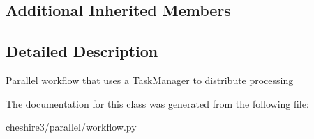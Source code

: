 \subsection*{Additional Inherited Members}


\subsection{Detailed Description}
\begin{DoxyVerb}Parallel workflow that uses a TaskManager to distribute processing \end{DoxyVerb}
 

The documentation for this class was generated from the following file\-:\begin{DoxyCompactItemize}
\item 
cheshire3/parallel/workflow.\-py\end{DoxyCompactItemize}
